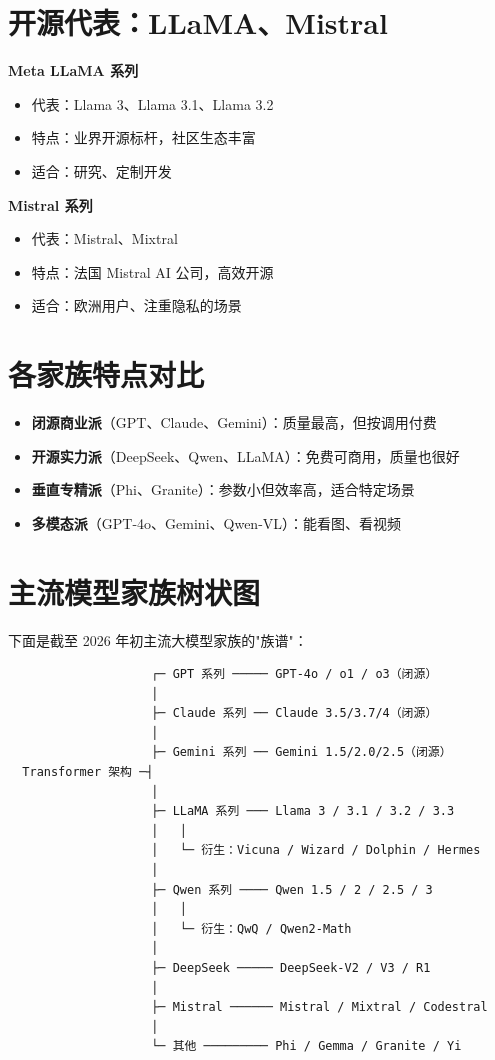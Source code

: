 \documentclass[12pt,UTF8]{ctexbook}
\begin{document}
\section{开源代表：LLaMA、Mistral}

\textbf{Meta LLaMA 系列}
\begin{itemize}
  \item 代表：Llama 3、Llama 3.1、Llama 3.2
  \item 特点：业界开源标杆，社区生态丰富
  \item 适合：研究、定制开发
\end{itemize}

\textbf{Mistral 系列}
\begin{itemize}
  \item 代表：Mistral、Mixtral
  \item 特点：法国 Mistral AI 公司，高效开源
  \item 适合：欧洲用户、注重隐私的场景
\end{itemize}

\section{各家族特点对比}

\begin{itemize}
  \item \textbf{闭源商业派}（GPT、Claude、Gemini）：质量最高，但按调用付费
  \item \textbf{开源实力派}（DeepSeek、Qwen、LLaMA）：免费可商用，质量也很好
  \item \textbf{垂直专精派}（Phi、Granite）：参数小但效率高，适合特定场景
  \item \textbf{多模态派}（GPT-4o、Gemini、Qwen-VL）：能看图、看视频
\end{itemize}

\section{主流模型家族树状图}

下面是截至 2026 年初主流大模型家族的"族谱"：

\begin{verbatim}
                    ┌─ GPT 系列 ───── GPT-4o / o1 / o3（闭源）
                    │
                    ├─ Claude 系列 ── Claude 3.5/3.7/4（闭源）
                    │
                    ├─ Gemini 系列 ── Gemini 1.5/2.0/2.5（闭源）
  Transformer 架构 ─┤
                    │
                    ├─ LLaMA 系列 ─── Llama 3 / 3.1 / 3.2 / 3.3
                    │   │
                    │   └─ 衍生：Vicuna / Wizard / Dolphin / Hermes
                    │
                    ├─ Qwen 系列 ──── Qwen 1.5 / 2 / 2.5 / 3
                    │   │
                    │   └─ 衍生：QwQ / Qwen2-Math
                    │
                    ├─ DeepSeek ───── DeepSeek-V2 / V3 / R1
                    │
                    ├─ Mistral ────── Mistral / Mixtral / Codestral
                    │
                    └─ 其他 ───────── Phi / Gemma / Granite / Yi
\end{verbatim}
\end{document}
